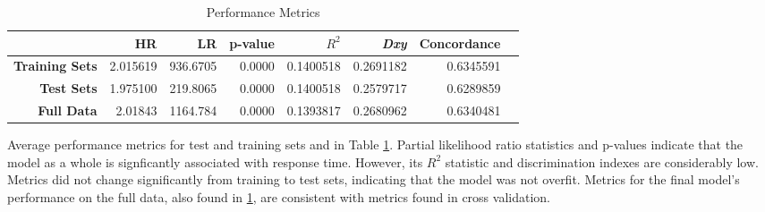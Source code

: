 \documentclass{article}
\begin{document}
\begin{table}[!htbp]
\centering
\begin{tabular}{| r | r | r | r | r  | r | r | r |}
  \hline
 & \textbf{HR} & \textbf{LR} & \textbf{p-value} & \textbf{$R^2$} & \textbf{\textit{Dxy}} & \textbf{Concordance} \\ 
  \hline
  \textbf{Training Sets} & 2.015619 & 936.6705 & 0.0000 & 0.1400518 & 0.2691182 & 0.6345591 \\ 
  \textbf{Test Sets} & 1.975100 & 219.8065 & 0.0000 & 0.1400518 & 0.2579717 & 0.6289859 \\
  \textbf{Full Data} & 2.01843 & 1164.784 & 0.0000 & 0.1393817 & 0.2680962 & 0.6340481 \\ 
   \hline
\end{tabular}
\caption{Performance Metrics} 
\label{table:cv}
\end{table}

Average performance metrics for test and training sets and in Table \ref{table:cv}. Partial likelihood ratio statistics and p-values indicate that the model as a whole is signficantly associated with response time. However, its $R^2$ statistic and discrimination indexes are considerably low. Metrics did not change significantly from training to test sets, indicating that the model was not overfit. Metrics for the final model's performance on the full data, also found in \ref{table:cv}, are consistent with metrics found in cross validation.
\end{document}
